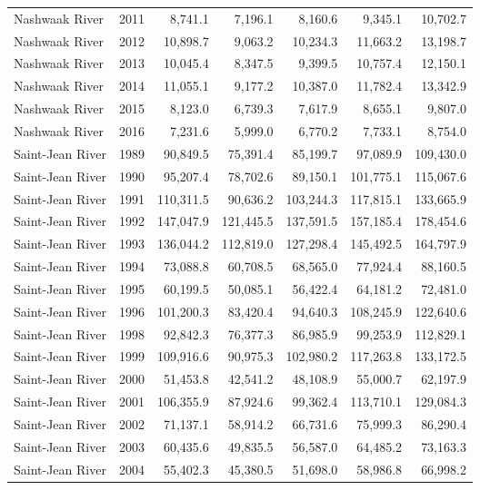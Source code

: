 \begin{longtable}{llrrrrr}
  Nashwaak River & 2011 & 8,741.1 & 7,196.1 & 8,160.6 & 9,345.1 & 10,702.7 \\ 
  Nashwaak River & 2012 & 10,898.7 & 9,063.2 & 10,234.3 & 11,663.2 & 13,198.7 \\ 
  Nashwaak River & 2013 & 10,045.4 & 8,347.5 & 9,399.5 & 10,757.4 & 12,150.1 \\ 
  Nashwaak River & 2014 & 11,055.1 & 9,177.2 & 10,387.0 & 11,782.4 & 13,342.9 \\ 
  Nashwaak River & 2015 & 8,123.0 & 6,739.3 & 7,617.9 & 8,655.1 & 9,807.0 \\ 
  Nashwaak River & 2016 & 7,231.6 & 5,999.0 & 6,770.2 & 7,733.1 & 8,754.0 \\ 
  Saint-Jean River & 1989 & 90,849.5 & 75,391.4 & 85,199.7 & 97,089.9 & 109,430.0 \\ 
  Saint-Jean River & 1990 & 95,207.4 & 78,702.6 & 89,150.1 & 101,775.1 & 115,067.6 \\ 
  Saint-Jean River & 1991 & 110,311.5 & 90,636.2 & 103,244.3 & 117,815.1 & 133,665.9 \\ 
  Saint-Jean River & 1992 & 147,047.9 & 121,445.5 & 137,591.5 & 157,185.4 & 178,454.6 \\ 
  Saint-Jean River & 1993 & 136,044.2 & 112,819.0 & 127,298.4 & 145,492.5 & 164,797.9 \\ 
  Saint-Jean River & 1994 & 73,088.8 & 60,708.5 & 68,565.0 & 77,924.4 & 88,160.5 \\ 
  Saint-Jean River & 1995 & 60,199.5 & 50,085.1 & 56,422.4 & 64,181.2 & 72,481.0 \\ 
  Saint-Jean River & 1996 & 101,200.3 & 83,420.4 & 94,640.3 & 108,245.9 & 122,640.6 \\ 
  Saint-Jean River & 1998 & 92,842.3 & 76,377.3 & 86,985.9 & 99,253.9 & 112,829.1 \\ 
  Saint-Jean River & 1999 & 109,916.6 & 90,975.3 & 102,980.2 & 117,263.8 & 133,172.5 \\ 
  Saint-Jean River & 2000 & 51,453.8 & 42,541.2 & 48,108.9 & 55,000.7 & 62,197.9 \\ 
  Saint-Jean River & 2001 & 106,355.9 & 87,924.6 & 99,362.4 & 113,710.1 & 129,084.3 \\ 
  Saint-Jean River & 2002 & 71,137.1 & 58,914.2 & 66,731.6 & 75,999.3 & 86,290.4 \\ 
  Saint-Jean River & 2003 & 60,435.6 & 49,835.5 & 56,587.0 & 64,485.2 & 73,163.3 \\ 
  Saint-Jean River & 2004 & 55,402.3 & 45,380.5 & 51,698.0 & 58,986.8 & 66,998.2 \\ 

\end{longtable}
